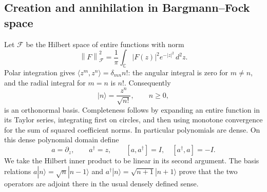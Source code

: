 \documentclass[11pt]{article}
\numberwithin{equation}{section}
\theoremstyle{definition}
\theoremstyle{remark}
\newcommand{\C}{\mathbb{C}}
\newcommand{\norm}[1]{\left\lVert#1\right\rVert}
\begin{document}
\subsection{Creation and annihilation in Bargmann--Fock space}
Let $\mathcal F$ be the Hilbert space of entire functions with norm
\begin{equation}\label{eq:focknorm}
 \norm{F}_{\mathcal F}^2=
 \frac1\pi\int_{\C}|F(z)|^2e^{-|z|^2}\,d^2z.
\end{equation}
Polar integration gives
$\langle z^m,z^n\rangle=\delta_{mn}n!$: the angular integral is
zero for $m\ne n$, and the radial integral for $m=n$ is $n!$.
Consequently
\begin{equation}\label{eq:fockbasis}
 |n\rangle=\frac{z^n}{\sqrt{n!}},\qquad n\geq0,
\end{equation}
is an orthonormal basis. Completeness follows by expanding an
entire function in its Taylor series, integrating first on circles,
and then using monotone convergence for the sum of squared
coefficient norms. In particular polynomials are dense.
On this dense polynomial domain define
\begin{equation}\label{eq:creation}
 a=\partial_z,\qquad a^\dagger=z,
 \qquad[a,a^\dagger]=I,\quad[a^\dagger,a]=-I.
\end{equation}
We take the Hilbert inner product to be linear in its second argument.
The basis relations
$a|n\rangle=\sqrt n|n-1\rangle$ and
$a^\dagger|n\rangle=\sqrt{n+1}|n+1\rangle$ prove that the two
operators are adjoint there in the usual densely defined sense.
\end{document}
